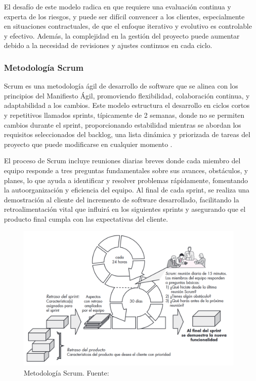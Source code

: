\documentclass[main.tex]{subfiles}
\begin{document}
El desafío de este modelo radica en que requiere una evaluación continua y experta de los riesgos, y puede ser difícil convencer a los clientes, especialmente en situaciones contractuales, de que el enfoque iterativo y evolutivo es controlable y efectivo. Además, la complejidad en la gestión del proyecto puede aumentar debido a la necesidad de revisiones y ajustes continuos en cada ciclo.

\subsubsection{Metodología Scrum}

Scrum es una metodología ágil de desarrollo de software que se alinea con los principios del Manifiesto Ágil, promoviendo flexibilidad, colaboración continua, y adaptabilidad a los cambios. Este modelo estructura el desarrollo en ciclos cortos y repetitivos llamados sprints, típicamente de 2 semanas, donde no se permiten cambios durante el sprint, proporcionando estabilidad mientras se abordan los requisitos seleccionados del backlog, una lista dinámica y priorizada de tareas del proyecto que puede modificarse en cualquier momento \cite{pressman2010ingeneria}.

El proceso de Scrum incluye reuniones diarias breves donde cada miembro del equipo responde a tres preguntas fundamentales sobre sus avances, obstáculos, y planes, lo que ayuda a identificar y resolver problemas rápidamente, fomentando la autoorganización y eficiencia del equipo. Al final de cada sprint, se realiza una demostración al cliente del incremento de software desarrollado, facilitando la retroalimentación vital que influirá en los siguientes sprints y asegurando que el producto final cumpla con las expectativas del cliente.

\begin{figure}[h]
	\centering
	\includegraphics[width=\linewidth]{./assets/model-scrum.png}
	\caption{Metodología Scrum. Fuente: \cite{pressman2010ingeneria}}
\end{figure}
\end{document}
